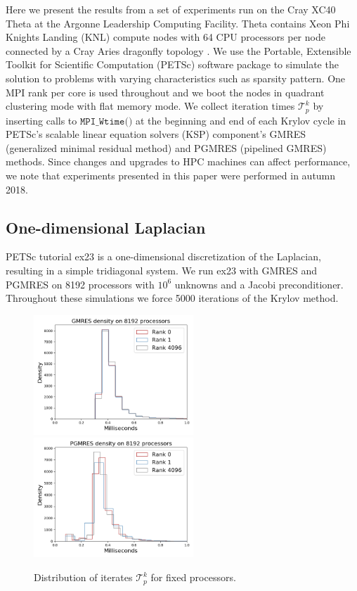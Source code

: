 \documentclass[num-refs]{wiley-article}
\begin{document}
Here we present the results from a set of experiments run on the Cray XC40 Theta at the Argonne Leadership Computing Facility. 
Theta contains Xeon Phi Knights Landing (KNL) compute nodes \cite{sodani2015knights} with 64 CPU processors per node connected by a Cray Aries dragonfly topology \cite{alverson2012cray}.
We use the Portable, Extensible Toolkit for Scientific Computation (PETSc) \cite{balay2017petsc, balay2001petsc} software package to simulate the solution to problems with varying characteristics such as sparsity pattern. 
One MPI rank per core is used throughout and we boot the nodes in quadrant clustering mode with flat memory mode. 
We collect iteration times $\mathcal{T}^k_p$ by inserting calls to ${\texttt{MPI\_Wtime()}}$ at the beginning and end of each Krylov cycle in PETSc's scalable linear equation solvers (KSP) component's GMRES (generalized minimal residual method) and PGMRES (pipelined GMRES) methods. 
Since changes and upgrades to HPC machines can affect performance, we note that experiments presented in this paper were performed in autumn 2018. 


\subsection{One-dimensional Laplacian} \label{sec:ex23}
PETSc tutorial ex23 is a one-dimensional discretization of the Laplacian, resulting in a simple tridiagonal system. 
We run ex23 with GMRES and PGMRES on 8192 processors with $10^6$ unknowns and a Jacobi preconditioner. 
Throughout these simulations we force 5000 iterations of the Krylov method.


\begin{figure}[t]
\centering
\includegraphics[width=6cm]{../plots/GMRES_ex23_8192_1000000_identical_in_p.png}
\includegraphics[width=6cm]{../plots/PGMRES_ex23_8192_1000000_identical_in_p.png}
\caption{Distribution of iterates $\mathcal{T}^k_p$ for fixed processors.} \label{fig:ex23-identical}
\end{figure}
\end{document}
